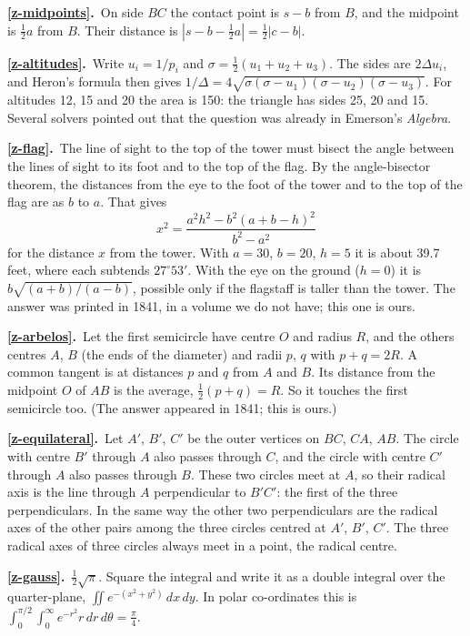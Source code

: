 \documentclass[11pt,a4paper]{article}
\newcommand{\ans}[2]{\par\smallskip\noindent\textbf{\ref{#1}.}\ #2}
\begin{document}
\ans{z-midpoints}{On side $BC$ the contact point is $s - b$ from $B$, and the midpoint is
$\tfrac12a$ from $B$. Their distance is $|s - b - \tfrac12a| = \tfrac12|c - b|$.}

\ans{z-altitudes}{Write $u_i = 1/p_i$ and $\sigma = \tfrac12(u_1+u_2+u_3)$. The sides are
$2\Delta u_i$, and Heron's formula then gives
$1/\Delta = 4\sqrt{\sigma(\sigma-u_1)(\sigma-u_2)(\sigma-u_3)}$. For altitudes 12, 15 and
20 the area is 150: the triangle has sides 25, 20 and 15. Several solvers pointed out that
the question was already in Emerson's \textit{Algebra}.}

\ans{z-flag}{The line of sight to the top of the tower must bisect the angle between the
lines of sight to its foot and to the top of the flag. By the angle-bisector theorem, the
distances from the eye to the foot of the tower and to the top of the flag are as $b$ to
$a$. That gives
\[ x^2 = \frac{a^2h^2 - b^2(a+b-h)^2}{b^2 - a^2} \]
for the distance $x$ from the tower. With $a = 30$, $b = 20$, $h = 5$ it is about 39.7 feet,
where each subtends $27^\circ53'$. With the eye on the ground ($h = 0$) it is
$b\sqrt{(a+b)/(a-b)}$, possible only if the flagstaff is taller than the tower. The answer
was printed in 1841, in a volume we do not have; this one is ours.}

\ans{z-arbelos}{Let the first semicircle have centre $O$ and radius $R$, and the others
centres $A$, $B$ (the ends of the diameter) and radii $p$, $q$ with $p + q = 2R$. A common
tangent is at distances $p$ and $q$ from $A$ and $B$. Its distance from the midpoint $O$ of
$AB$ is the average, $\tfrac12(p+q) = R$. So it touches the first semicircle too. (The
answer appeared in 1841; this is ours.)}

\ans{z-equilateral}{Let $A'$, $B'$, $C'$ be the outer vertices on $BC$, $CA$, $AB$. The circle
with centre $B'$ through $A$ also passes through $C$, and the circle with centre $C'$
through $A$ also passes through $B$. These two circles meet at $A$, so their radical axis
is the line through $A$ perpendicular to $B'C'$: the first of the three perpendiculars.
In the same way the other two perpendiculars are the radical axes of the other pairs among
the three circles centred at $A'$, $B'$, $C'$. The three radical axes of three circles
always meet in a point, the radical centre.}

\ans{z-gauss}{$\tfrac12\sqrt\pi$. Square the integral and write it as a double integral
over the quarter-plane, $\iint e^{-(x^2+y^2)}\,dx\,dy$. In polar co-ordinates this is
$\int_0^{\pi/2}\int_0^\infty e^{-r^2}r\,dr\,d\theta = \tfrac\pi4$.}
\end{document}
